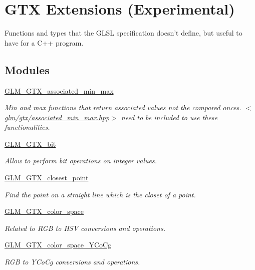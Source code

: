 \hypertarget{group__gtx}{\section{G\-T\-X Extensions (Experimental)}
\label{group__gtx}
}


Functions and types that the G\-L\-S\-L specification doesn't define, but useful to have for a C++ program.  


\subsection*{Modules}
\begin{DoxyCompactItemize}
\item 
\hyperlink{group__gtx__associated__min__max}{G\-L\-M\-\_\-\-G\-T\-X\-\_\-associated\-\_\-min\-\_\-max}
\begin{DoxyCompactList}\small\item\em Min and max functions that return associated values not the compared onces. $<$\hyperlink{associated__min__max_8hpp}{glm/gtx/associated\-\_\-min\-\_\-max.\-hpp}$>$ need to be included to use these functionalities. \end{DoxyCompactList}\item 
\hyperlink{group__gtx__bit}{G\-L\-M\-\_\-\-G\-T\-X\-\_\-bit}
\begin{DoxyCompactList}\small\item\em Allow to perform bit operations on integer values. \end{DoxyCompactList}\item 
\hyperlink{group__gtx__closest__point}{G\-L\-M\-\_\-\-G\-T\-X\-\_\-closest\-\_\-point}
\begin{DoxyCompactList}\small\item\em Find the point on a straight line which is the closet of a point. \end{DoxyCompactList}\item 
\hyperlink{group__gtx__color__space}{G\-L\-M\-\_\-\-G\-T\-X\-\_\-color\-\_\-space}
\begin{DoxyCompactList}\small\item\em Related to R\-G\-B to H\-S\-V conversions and operations. \end{DoxyCompactList}\item 
\hyperlink{group__gtx__color__space__YCoCg}{G\-L\-M\-\_\-\-G\-T\-X\-\_\-color\-\_\-space\-\_\-\-Y\-Co\-Cg}
\begin{DoxyCompactList}\small\item\em R\-G\-B to Y\-Co\-Cg conversions and operations. \end{DoxyCompactList}\item 

\end{DoxyCompactItemize}
